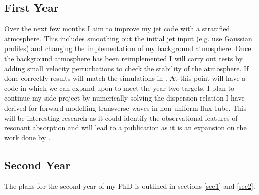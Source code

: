 \documentclass[12pt,a4paper,twoside]{article}
\begin{document}
\subsection{First Year}
Over the next few months I aim to improve my jet code with a stratified atmosphere. This includes smoothing out the initial jet input (e.g. use Gaussian profiles) and changing the implementation of my background atmosphere. Once the background atmosphere has been reimplemented I will carry out tests by adding small velocity perturbations to check the stability of the atmosphere. If done correctly results will match the simulations in \cite{Shelyag2008}. At this point will have a code in which we can expand upon to meet the year two targets. I plan to continue my side project by numerically solving the dispersion relation I have derived for forward modelling transverse waves in non-uniform flux tube. This will be interesting research as it could identify the observational features of resonant absorption and will lead to a publication as it is an expansion on the work done by \cite{Yuan_2016}. 
\subsection{Second Year}
The plans for the second year of my PhD is outlined in sections \eqref{sec1} and \eqref{sec2}.
\end{document}
